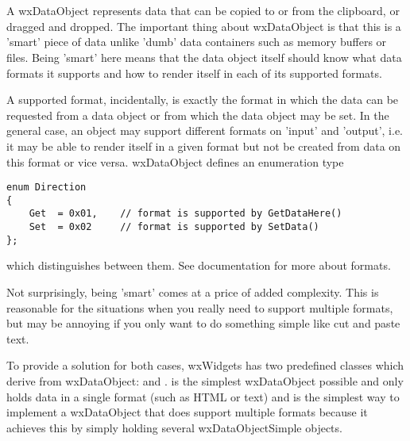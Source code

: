 
\section{}\label{wxdataobject}

A wxDataObject represents data that can be copied to or from the clipboard, or
dragged and dropped. The important thing about wxDataObject is that this is a
'smart' piece of data unlike 'dumb' data containers such as memory
buffers or files. Being 'smart' here means that the data object itself should
know what data formats it supports and how to render itself in each of
its supported formats.

A supported format, incidentally, is exactly the format in which the data can
be requested from a data object or from which the data object may be set. In
the general case, an object may support different formats on 'input' and
'output', i.e. it may be able to render itself in a given format but not be
created from data on this format or vice versa. wxDataObject defines an
enumeration type

\begin{verbatim}
enum Direction
{
    Get  = 0x01,    // format is supported by GetDataHere()
    Set  = 0x02     // format is supported by SetData()
};
\end{verbatim}

which distinguishes between them. See 
 documentation for more about formats.

Not surprisingly, being 'smart' comes at a price of added complexity. This is
reasonable for the situations when you really need to support multiple formats,
but may be annoying if you only want to do something simple like cut and paste
text.

To provide a solution for both cases, wxWidgets has two predefined classes
which derive from wxDataObject:  and 
. 
 is
the simplest wxDataObject possible and only holds data in a single format (such
as HTML or text) and  is
the simplest way to implement a wxDataObject that does support multiple formats
because it achieves this by simply holding several wxDataObjectSimple objects.

